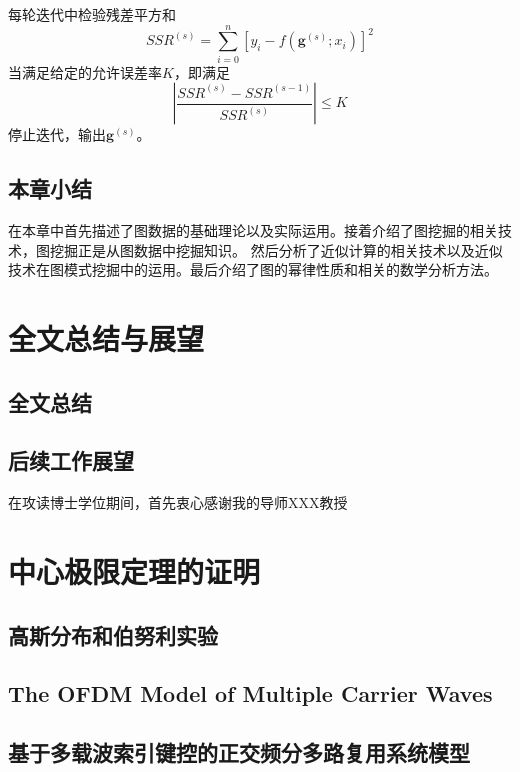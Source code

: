 \documentclass[master]{thesis-uestc}
\begin{document}
每轮迭代中检验残差平方和
\begin{equation*}
    SSR^{(s)}=\sum_{i=0}^n\left[y_i-f\left( \mathbf{g}^{(s)};x_i\right)\right]^2
\end{equation*}
当满足给定的允许误差率$K$，即满足
\begin{equation*}
    \left|\frac{S S R^{(s)}-S S R^{(s-1)}}{S S R^{(s)}}\right| \leq K
\end{equation*}
停止迭代，输出$\mathbf{g}^{(s)}$。

\section{本章小结}
\label{sec:theroy-summary}
    在本章中首先描述了图数据的基础理论以及实际运用。接着介绍了图挖掘的相关技术，图挖掘正是从图数据中挖掘知识。
然后分析了近似计算的相关技术以及近似技术在图模式挖掘中的运用。最后介绍了图的幂律性质和相关的数学分析方法。

\chapter{全文总结与展望}

\section{全文总结}

\section{后续工作展望}

\thesisacknowledgement
在攻读博士学位期间，首先衷心感谢我的导师XXX教授

\thesisappendix

\chapter{中心极限定理的证明}

\section{高斯分布和伯努利实验}




%
% 
%
% 
% 
%


\thesistranslationoriginal
\section{The OFDM Model of Multiple Carrier Waves}

\thesistranslationchinese
\section{基于多载波索引键控的正交频分多路复用系统模型}
\end{document}
